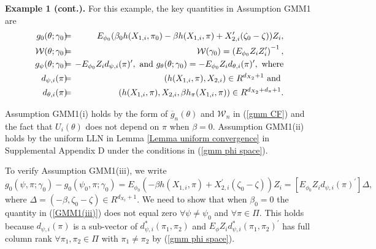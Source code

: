 \documentclass[12pt,titlepage,final,oneside,letterpaper]{article}
\begin{document}
\noindent \textbf{Example 1 (cont.). }For this example, the key quantities
in Assumption GMM1 are 
\begin{eqnarray}
g_{0}(\theta ;\gamma _{0})\hspace{-0.08in} &=&\hspace{-0.08in}E_{\phi
_{0}}(\beta _{0}h(X_{1,i},\pi _{0})-\beta h(X_{1,i},\pi )+X_{2,i}^{\prime
}(\zeta _{0}-\zeta ))Z_{i},  \notag \\
\mathcal{W}(\theta ;\gamma _{0})\hspace{-0.08in} &=&\hspace{-0.08in}\mathcal{%
W}(\gamma _{0})=\left( E_{\phi _{0}}Z_{i}Z_{i}^{\prime }\right) ^{-1}, 
\notag \\
g_{\psi }(\theta ;\gamma _{0})\hspace{-0.08in} &=&\hspace{-0.08in}-E_{\phi
_{0}}Z_{i}d_{\psi ,i}(\pi )^{\prime },\text{ and }g_{\theta }(\theta ;\gamma
_{0})=-E_{\phi _{0}}Z_{i}d_{\theta ,i}(\pi )^{\prime },\text{ where}  \notag
\\
d_{\psi ,i}(\pi )\hspace{-0.08in} &=&\hspace{-0.08in}(h(X_{1,i},\pi
),X_{2,i})\in R^{d_{X_{2}}+1}\text{ and }  \notag \\
d_{\theta ,i}(\pi )\hspace{-0.08in} &=&\hspace{-0.08in}(h(X_{1,i},\pi
),X_{2,i},\beta h_{\pi }(X_{1,i},\pi ))\in R^{d_{X_{2}}+d_{\pi }+1}.
\label{form of g_0 and weight}
\end{eqnarray}

Assumption GMM1(i) holds by the form of $\overline{g}_{n}(\theta )$ and $%
\mathcal{W}_{n}$ in (\ref{gmm CF}) and the fact that $U_{i}(\theta )$ does
not depend on $\pi $ when $\beta =0.$ Assumption GMM1(ii) holds by the
uniform LLN in Lemma \ref{Lemma uniform convergence} in Supplemental
Appendix D under the conditions in (\ref{gmm phi space}).

To verify Assumption GMM1(iii), we write%
\begin{equation}
g_{0}(\psi ,\pi ;\gamma _{0})-g_{0}(\psi _{0},\pi ;\gamma _{0})=E_{\phi
_{0}}(-\beta h(X_{1,i},\pi )+X_{2,i}^{\prime }(\zeta _{0}-\zeta ))Z_{i}= 
\left[ E_{\phi _{0}}Z_{i}d_{\psi ,i}(\pi )^{\prime }\right] \Delta ,
\label{GMM1(iii)}
\end{equation}%
where $\Delta =(-\beta ,\zeta _{0}-\zeta )\in R^{d_{X_{2}}+1}.$ We need to
show that when $\beta _{0}=0$ the quantity in (\ref{GMM1(iii)}) does not
equal zero $\forall \psi \neq \psi _{0}$ and $\forall \pi \in \Pi .$ This
holds because $d_{\psi ,i}(\pi )$ is a sub-vector of $d_{\psi ,i}^{\ast
}(\pi _{1},\pi _{2})$ and $E_{\phi }Z_{i}d_{\psi ,i}^{\ast }(\pi _{1},\pi
_{2})^{\prime }$ has full column rank $\forall \pi _{1},\pi _{2}\in \Pi $
with $\pi _{1}\neq \pi _{2}$ by (\ref{gmm phi space}).
\end{document}
